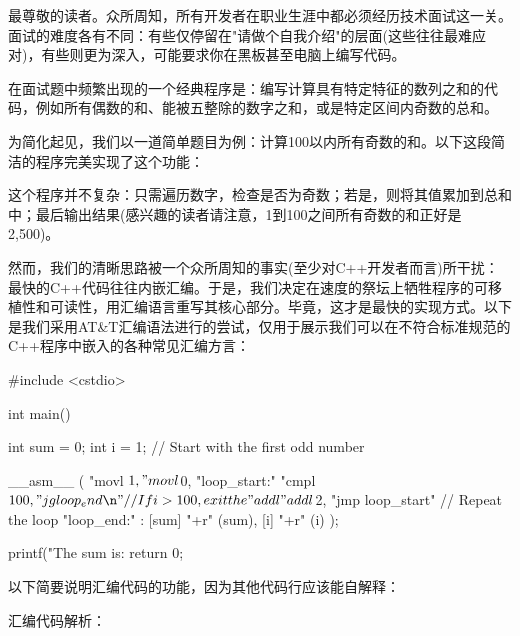 
最尊敬的读者。众所周知，所有开发者在职业生涯中都必须经历技术面试这一关。面试的难度各有不同：有些仅停留在"请做个自我介绍"的层面(这些往往最难应对)，有些则更为深入，可能要求你在黑板甚至电脑上编写代码。

在面试题中频繁出现的一个经典程序是：编写计算具有特定特征的数列之和的代码，例如所有偶数的和、能被五整除的数字之和，或是特定区间内奇数的总和。

为简化起见，我们以一道简单题目为例：计算100以内所有奇数的和。以下这段简洁的程序完美实现了这个功能：


这个程序并不复杂：只需遍历数字，检查是否为奇数；若是，则将其值累加到总和中；最后输出结果(感兴趣的读者请注意，1到100之间所有奇数的和正好是2,500)。

然而，我们的清晰思路被一个众所周知的事实(至少对C++开发者而言)所干扰：最快的C++代码往往内嵌汇编。于是，我们决定在速度的祭坛上牺牲程序的可移植性和可读性，用汇编语言重写其核心部分。毕竟，这才是最快的实现方式。以下是我们采用AT\&T汇编语法进行的尝试，仅用于展示我们可以在不符合标准规范的C++程序中嵌入的各种常见汇编方言：

\begin{cpp}
#include <cstdio>

int main() {
  int sum = 0;
  int i = 1; // Start with the first odd number
         
  __asm__ (
    "movl $1, %
    "movl $0, %
    "loop_start:\n"
    "cmpl $100, %
    "jg loop_end\n" // If i > 100, exit the
    "addl %
    "addl $2, %
    "jmp loop_start\n" // Repeat the loop
    "loop_end:\n"
    : [sum] "+r" (sum), [i] "+r" (i)
  );

  printf("The sum is: %
  return 0;
}
\end{cpp}

以下简要说明汇编代码的功能，因为其他代码行应该能自解释：

汇编代码解析：

